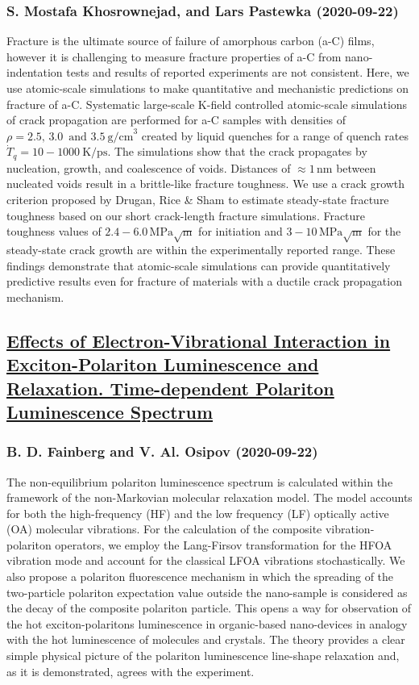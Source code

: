 {\subsubsection*{S. Mostafa Khosrownejad, and Lars Pastewka (2020-09-22)}
Fracture is the ultimate source of failure of amorphous carbon (a-C) films,
however it is challenging to measure fracture properties of a-C from
nano-indentation tests and results of reported experiments are not consistent.
Here, we use atomic-scale simulations to make quantitative and mechanistic
predictions on fracture of a-C. Systematic large-scale K-field controlled
atomic-scale simulations of crack propagation are performed for a-C samples
with densities of $\rho=2.5, \, 3.0 \, \text{ and } 3.5~\text{g/cm}^{3}$
created by liquid quenches for a range of quench rates $\dot{T}_q = 10 -
1000~\text{K/ps}$. The simulations show that the crack propagates by
nucleation, growth, and coalescence of voids. Distances of $ \approx 1\,
\text{nm}$ between nucleated voids result in a brittle-like fracture toughness.
We use a crack growth criterion proposed by Drugan, Rice \& Sham to estimate
steady-state fracture toughness based on our short crack-length fracture
simulations. Fracture toughness values of $2.4-6.0\,\text{MPa}\sqrt{\text{m}}$
for initiation and $3-10\,\text{MPa}\sqrt{\text{m}}$ for the steady-state crack
growth are within the experimentally reported range. These findings demonstrate
that atomic-scale simulations can provide quantitatively predictive results
even for fracture of materials with a ductile crack propagation mechanism.

\subsection*{\href{http://arxiv.org/abs/2009.10806v1}{Effects of Electron-Vibrational Interaction in Exciton-Polariton  Luminescence and Relaxation. Time-dependent Polariton Luminescence Spectrum}}
\subsubsection*{B. D. Fainberg and V. Al. Osipov (2020-09-22)}
The non-equilibrium polariton luminescence spectrum is calculated within the
framework of the non-Markovian molecular relaxation model. The model accounts
for both the high-frequency (HF) and the low frequency (LF) optically active
(OA) molecular vibrations. For the calculation of the composite
vibration-polariton operators, we employ the Lang-Firsov transformation for the
HFOA vibration mode and account for the classical LFOA vibrations
stochastically. We also propose a polariton fluorescence mechanism in which the
spreading of the two-particle polariton expectation value outside the
nano-sample is considered as the decay of the composite polariton particle.
This opens a way for observation of the hot exciton-polaritons luminescence in
organic-based nano-devices in analogy with the hot luminescence of molecules
and crystals. The theory provides a clear simple physical picture of the
polariton luminescence line-shape relaxation and, as it is demonstrated, agrees
with the experiment.

}
